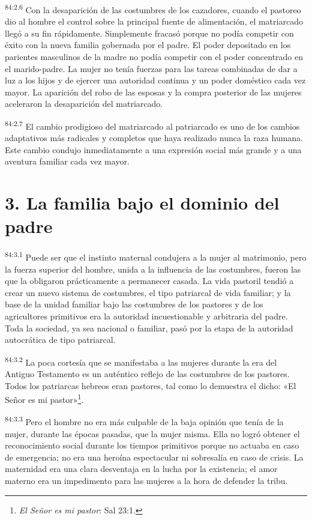 \par
\textsuperscript{84:2.6} Con la desaparición de las costumbres de los cazadores, cuando el pastoreo dio al hombre el control sobre la principal fuente de alimentación, el matriarcado llegó a su fin rápidamente. Simplemente fracasó porque no podía competir con éxito con la nueva familia gobernada por el padre. El poder depositado en los parientes masculinos de la madre no podía competir con el poder concentrado en el marido-padre. La mujer no tenía fuerzas para las tareas combinadas de dar a luz a los hijos y de ejercer una autoridad continua y un poder doméstico cada vez mayor. La aparición del robo de las esposas y la compra posterior de las mujeres aceleraron la desaparición del matriarcado.

\par
\textsuperscript{84:2.7} El cambio prodigioso del matriarcado al patriarcado es uno de los cambios adaptativos más radicales y completos que haya realizado nunca la raza humana. Este cambio condujo inmediatamente a una expresión social más grande y a una aventura familiar cada vez mayor.

\section*{3. La familia bajo el dominio del padre}
\par
\textsuperscript{84:3.1} Puede ser que el instinto maternal condujera a la mujer al matrimonio, pero la fuerza superior del hombre, unida a la influencia de las costumbres, fueron las que la obligaron prácticamente a permanecer casada. La vida pastoril tendió a crear un nuevo sistema de costumbres, el tipo patriarcal de vida familiar; y la base de la unidad familiar bajo las costumbres de los pastores y de los agricultores primitivos era la autoridad incuestionable y arbitraria del padre. Toda la sociedad, ya sea nacional o familiar, pasó por la etapa de la autoridad autocrática de tipo patriarcal.

\par
\textsuperscript{84:3.2} La poca cortesía que se manifestaba a las mujeres durante la era del Antiguo Testamento es un auténtico reflejo de las costumbres de los pastores. Todos los patriarcas hebreos eran pastores, tal como lo demuestra el dicho: «El Señor es mi pastor»\footnote{\textit{El Señor es mi pastor}: Sal 23:1.}.

\par
\textsuperscript{84:3.3} Pero el hombre no era más culpable de la baja opinión que tenía de la mujer, durante las épocas pasadas, que la mujer misma. Ella no logró obtener el reconocimiento social durante los tiempos primitivos porque no actuaba en caso de emergencia; no era una heroína espectacular ni sobresalía en caso de crisis. La maternidad era una clara desventaja en la lucha por la existencia; el amor materno era un impedimento para las mujeres a la hora de defender la tribu.

